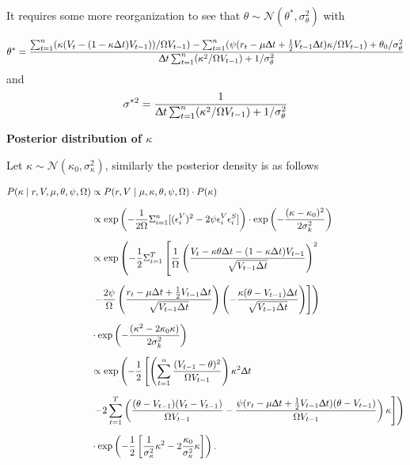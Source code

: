 \documentclass[12pt,a4paper]{article}
\numberwithin{equation}{section}
\begin{document}
It requires some more reorganization to see that $\theta \sim \mathcal{N}(\theta^*, \sigma_\theta^2)$ with

\[
\theta^* = \frac{\sum_{t=1}^n (\kappa (V_t - (1-\kappa \Delta t) V_{t-1}))/\Omega V_{t-1}) - \sum_{t=1}^n (\psi (r_t - \mu  \Updelta t  + \frac{1}{2} V_{t-1} \Updelta t ) \kappa /\Omega V_{t-1}) + \theta_0/\sigma_\theta^2}{\Updelta t \sum_{t=1}^n (\kappa^2 / \Omega V_{t-1}) + 1 / \sigma_\theta^2}
\]
and
\[
\sigma^{*2} = \frac{1}{\Updelta t \sum_{t=1}^n (\kappa^2 / \Omega V_{t-1}) + 1 / \sigma_{\theta}^2}
\]

\textbf{Posterior distribution of $\kappa$}

Let $\kappa \sim \mathcal{N}(\kappa_0, \sigma_\kappa^2)$, similarly the posterior density is as follows

\begin{align*}
P(\kappa \mid r, V, \mu, \theta, \psi, \Omega) & \propto P(r, V \mid \mu, \kappa, \theta, \psi, \Omega) \cdot P(\kappa) \\[0.6em]
&\propto \exp\left(-\frac{1}{2\Omega} \Sigma_{i=1}^n [(\epsilon_i^V)^2 - 2\psi \epsilon_i^V \epsilon_i^S]\right) \cdot \exp\left(-\frac{(\kappa - \kappa_0)^2}{2\sigma_k^2}\right) \\[0.6em]
&\propto \exp\left(-\frac{1}{2} \Sigma_{i=1}^T \left[ \frac{1}{\Omega} \left( \frac{V_t - \kappa \theta \Delta t - (1 - \kappa \Delta t) V_{t-1}}{\sqrt{V_{t-1} \Delta t}} \right)^2 \right. \right. \\[0.6em]
& \left. \left.  - \frac{2\psi}{\Omega} \left( \frac{r_t - \mu \Delta t + \frac{1}{2} V_{t-1} \Delta t}{\sqrt{V_{t-1} \Delta t}} \right) \left( -\frac{\kappa (\theta - V_{t-1}) \Delta t}{\sqrt{V_{t-1} \Delta t}} \right) \right] \right) \\[0.6em]
& \cdot \exp\left(-\frac{(\kappa^2 - 2\kappa_0 \kappa)}{2\sigma_k^2}\right)\\[0.6em]
& \propto\exp\left(-\frac{1}{2} \left[\left(\sum_{t=1}^n \frac{(V_{t-1} - \theta)^2}{\Omega V_{t-1}} \right) \kappa^2 \Updelta t \right. \right. \\[0.6em] 
& \left. \left. - 2\sum_{t=1}^T \left( \frac{(\theta - V_{t-1}) (V_t - V_{t-1})}{\Omega V_{t-1}} - \frac{\psi (r_t - \mu \Updelta t + \frac{1}{2} V_{t-1} \Updelta t )(\theta - V_{t-1})}{\Omega V_{t-1}} \right) \kappa \right] \right) \\[0.6em]
& \cdot \exp\left(-\frac{1}{2} \left[\frac{1}{\sigma_\kappa^2} \kappa^2 - 2 \frac{\kappa_0}{\sigma_\kappa^2} \kappa \right] \right).
\end{align*}
\end{document}

